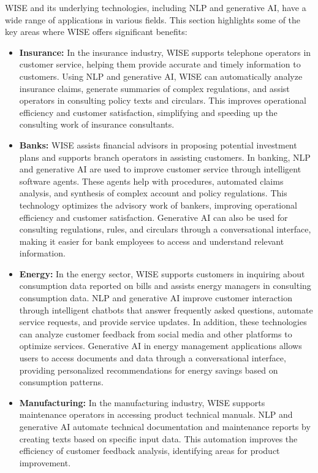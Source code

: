 WISE and its underlying technologies, including NLP and generative AI, have a wide range of applications in various fields. This section highlights some of the key areas where WISE offers significant benefits:

\begin{itemize}
    \item \textbf{Insurance:} In the insurance industry, WISE supports telephone operators in customer service, helping them provide accurate and timely information to customers. Using NLP and generative AI, WISE can automatically analyze insurance claims, generate summaries of complex regulations, and assist operators in consulting policy texts and circulars. This improves operational efficiency and customer satisfaction, simplifying and speeding up the consulting work of insurance consultants.
    \item \textbf{Banks:} WISE assists financial advisors in proposing potential investment plans and supports branch operators in assisting customers. In banking, NLP and generative AI are used to improve customer service through intelligent software agents. These agents help with procedures, automated claims analysis, and synthesis of complex account and policy regulations. This technology optimizes the advisory work of bankers, improving operational efficiency and customer satisfaction.
    Generative AI can also be used for consulting regulations, rules, and circulars through a conversational interface, making it easier for bank employees to access and understand relevant information.
    \item \textbf{Energy:} In the energy sector, WISE supports customers in inquiring about consumption data reported on bills and assists energy managers in consulting consumption data. NLP and generative AI improve customer interaction through intelligent chatbots that answer frequently asked questions, automate service requests, and provide service updates. In addition, these technologies can analyze customer feedback from social media and other platforms to optimize services.
    Generative AI in energy management applications allows users to access documents and data through a conversational interface, providing personalized recommendations for energy savings based on consumption patterns.
    \item \textbf{Manufacturing:} In the manufacturing industry, WISE supports maintenance operators in accessing product technical manuals. NLP and generative AI automate technical documentation and maintenance reports by creating texts based on specific input data. This automation improves the efficiency of customer feedback analysis, identifying areas for product improvement.  \cite{hpa2024}
\end{itemize}

